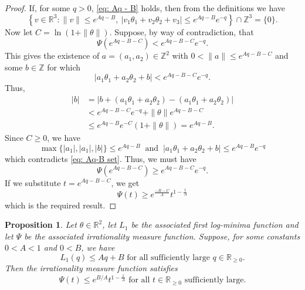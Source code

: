 \documentclass[reqno,11pt, twoside]{amsart}
\theoremstyle{plain}
\newtheorem{prop}[thm]{Proposition}
\theoremstyle{definition}
\theoremstyle{definition}
\theoremstyle{remark}
\numberwithin{equation}{section}
\newcommand{\R}{{\mathbb{R}}}
\newcommand{\Z}{{\mathbb{Z}}}
\begin{document}
\begin{proof}
    If, for some $q >0$, \eqref{eq: Aq - B} holds, then from the definitions we have
    \begin{equation}\label{eq: Aq-B set}
        \left\lbrace v \in \R^3: \|v\| \leq e^{Aq-B},\ |v_1\theta_1 + v_2 \theta_2 + v_3| \leq e^{Aq - B }e^{-q}\right\rbrace \cap \Z^3 = \{0\}.
    \end{equation}
    Now let $C = \ln(1 + \|\theta\|)$. Suppose, by way of contradiction, that 
\begin{equation*}
    \Psi(e^{Aq- B - C})  < e^{Aq-B - C}e^{-q}.
\end{equation*}
This gives the existence of $a = (a_1, a_2) \in \Z^2$ with $0 < \|a\| \leq e^{Aq-B - C}$ and some $b \in \Z$ for which
\begin{equation}\label{eq: atheta + b}
    |a_1\theta_1 + a_2 \theta_2 + b| < e^{Aq- B - C} e^{-q}.
\end{equation}
Thus,
\begin{equation}\label{eq: |b|}
\begin{split}
    |b|  &= |b + (a_1\theta_1 + a_2 \theta_2) - (a_1 \theta_1 + a_2 \theta_2)| \\
    &< e^{Aq - B - C} e^{-q} + \|\theta\| e^{Aq - B - C} \\
    & \leq e^{Aq - B} e^{-C} (1 + \|\theta\|) = e^{Aq - B}.
\end{split}
\end{equation}
Since $C \geq 0$, we have
\begin{equation*}
    \max\{|a_1|, |a_1|, |b|\} \leq e^{Aq - B}\ \text{ and }\ |a_1 \theta_1 + a_2 \theta_2 + b| \leq e^{Aq - B} e^{-q}
\end{equation*}
which contradicts \eqref{eq: Aq-B set}.
Thus, we must have
\begin{equation*}
    \Psi(e^{Aq-B -C}) \geq e^{Aq - B - C} e^{-q}.
\end{equation*}
If we substitute $t = e^{Aq -B -C}$, we get
\begin{equation*}
    \Psi(t) \geq e^{\frac{-B -C}{A}}t^{1-\frac{1}{A}}
\end{equation*}
which is the required result.
\end{proof}
\begin{prop}\label{prop: L1 leq all}
    Let $\theta \in \R^2$, let $L_1$ be the associated first log-minima function and let $\Psi$ be the associated irrationality measure function.
    Suppose, for some constants $0 < A < 1$ and $0 < B$, we have
    \begin{equation}\label{eq: L1 linear}
        L_1(q) \leq Aq + B \text{ for all sufficiently large } q \in \R_{\geq 0}.
    \end{equation}
    Then the irrationality measure function satisfies
    \begin{equation*}
        \Psi(t) \leq e^{B/A} t^{1- \frac{1}{A}} \text{ for all  $t \in \R_{\geq 0}$ sufficiently large.}
    \end{equation*}
\end{prop}
\end{document}
